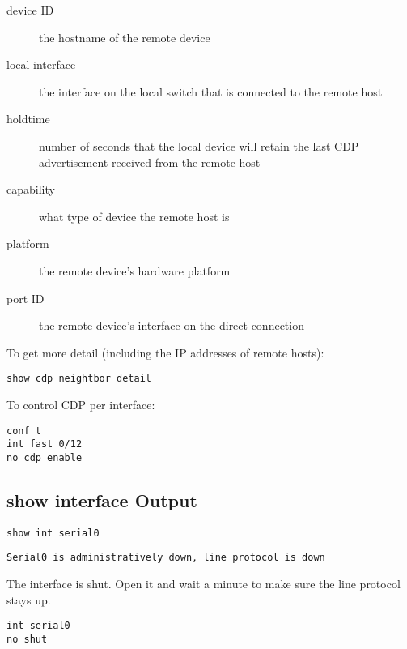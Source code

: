 \begin{description}

\item[device ID]
the hostname of the remote device

\item[local interface]
the interface on the local switch that is connected to the remote host

\item[holdtime]
number of seconds that the local device will retain the last CDP advertisement
received from the remote host

\item[capability]
what type of device the remote host is

\item[platform]
the remote device's hardware platform

\item[port ID]
the remote device's interface on the direct connection

\end{description}

To get more detail (including the IP addresses of remote hosts):

\begin{verbatim}
show cdp neightbor detail
\end{verbatim}

To control CDP per interface:

\begin{verbatim}
conf t
int fast 0/12
no cdp enable
\end{verbatim}

\subsection{show interface Output}

\begin{verbatim}
show int serial0
\end{verbatim}

\begin{verbatim}
Serial0 is administratively down, line protocol is down
\end{verbatim}

The interface is shut. Open it and wait a minute to make sure the line protocol
stays up.

\begin{verbatim}
int serial0
no shut
\end{verbatim}

